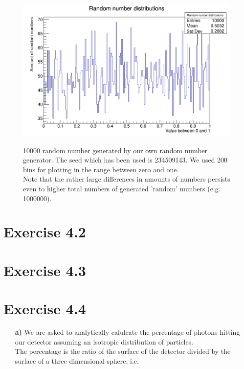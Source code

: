 \documentclass[10pt]{article}
\newenvironment{myfont}{\fontfamily{put}\selectfont}{\par}
\begin{document}
\begin{myfont}
\begin{figure}[H]
  \centering
  \caption{\num{10000} random number generated by our own random number generator.
  The seed which has been used is \num{234509143}.
  We used \num{200} bins for plotting in the range between zero and one. \\
  Note that the rather large differences in amounts of numbers persists even to higher total numbers of generated 'random' numbers (e.g. \num{1000000}).}
  \includegraphics[width = \textwidth]{./canvas.png}
  \label{fig:ex_1_results}
\end{figure}


\section*{Exercise 4.2}





\section*{Exercise 4.3}




\section*{Exercise 4.4}

\begin{itemize}
  \item[\textbf{a)}] We are asked to analytically calulcate the percentage of photons hitting our detector assuming an isotropic distribution of particles. \\
  The percentage is the ratio of the surface of the detector divided by the surface of a three dimensional sphere, i.e.


\end{itemize}
\end{myfont}
\end{document}
